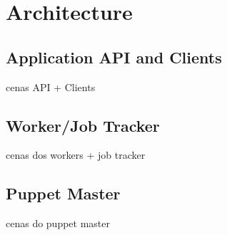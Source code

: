 \section {Architecture}

\subsection {Application API and Clients }
cenas API + Clients
\subsection {Worker/Job Tracker}
cenas dos workers + job tracker
\subsection {Puppet Master}
cenas do puppet master
